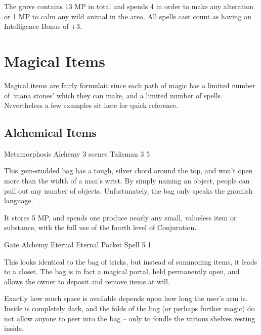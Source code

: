 \begin{multicols}{2}

The grove contains 13 MP in total and spends 4 in order to make any alteration or 1 MP to calm any wild animal in the area.
All spells cast count as having an Intelligence Bonus of +3.

\end{multicols}

\section{Magical Items}
\label{magicalitems}

\begin{multicols}{2}

\noindent
Magical items are fairly formulaic since each path of magic has a limited number of `mana stones' which they can make, and a limited number of spells.
Nevertheless a few examples sit here for quick reference.

\subsection{Alchemical Items}

  {Metamorphosis}%
  {Alchemy}%
  {3 scenes}%
  {Talisman}%
  {3}%
  {5}%

This gem-studded bag has a tough, silver chord around the top, and won't open more than the width of a man's wrist.
By simply naming an object, people can pull out any number of objects.
Unfortunately, the bag only speaks the gnomish language.

It stores 5 MP, and spends one produce nearly any small, valueless item or substance, with the full use of the fourth level of Conjuration.

\label{bagOfHolding}
  {Gate}%
  {Alchemy}%
  {Eternal}%
  {Eternal Pocket Spell}%
  {5}%
  {1}%

This looks identical to the bag of tricks, but instead of summoning items, it leads to a closet.
The bag is in fact a magical portal, held permanently open, and allows the owner to deposit and remove items at will.

Exactly how much space is available depends upon how long the user's arm is.  Inside is completely dark, and the folds of the bag (or perhaps further magic) do not allow anyone to peer into the bag -- only to fondle the various shelves resting inside.


\end{multicols}

